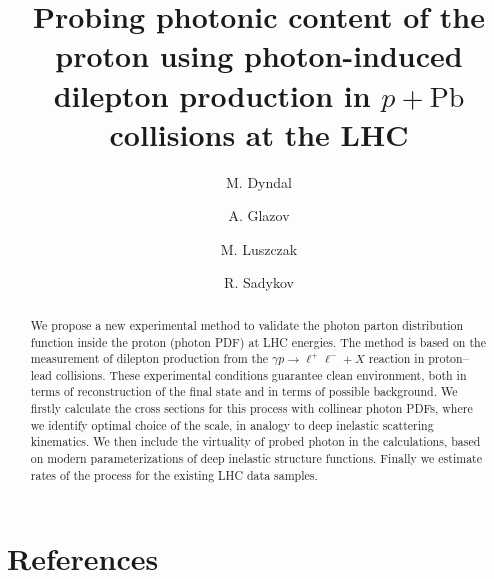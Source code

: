 \documentclass[preprint,12pt]{revtex4}
\begin{document}
\title{Probing photonic content of the proton using photon-induced dilepton production in $p+\textrm{Pb}$ collisions at the LHC}


\author{M. Dyndal}
\address{Deutsches Elektronen-Synchrotron DESY, Hamburg, Germany}

\author{A. Glazov}
\address{Deutsches Elektronen-Synchrotron DESY, Hamburg, Germany}

\author{M. Luszczak}
\address{Faculty of Mathematics and Natural Sciences, University of Rzeszow, Poland}
\author{R. Sadykov}
\address{Joint Institute for Nuclear Research (JINR), Dubna, Russia}



\begin{abstract}
We propose a new experimental method to validate the photon parton distribution function inside the proton (photon PDF) at LHC energies.
The method is based on the measurement of dilepton production from the $\gamma p\rightarrow\ell^+\ell^-+X$ reaction in proton--lead collisions. These experimental conditions guarantee clean environment, both in terms of reconstruction of the final state and in terms of possible background.
We firstly calculate the cross sections for this process with collinear photon PDFs, where we identify optimal choice of the scale, in analogy to deep inelastic scattering kinematics.
We then include the virtuality of probed photon in the calculations, based on modern parameterizations of deep inelastic structure functions.
Finally we estimate rates of the process for the existing LHC data samples.
\end{abstract}




\maketitle










\FloatBarrier




\section*{References}


\end{document}
